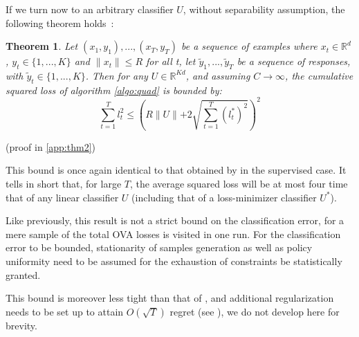 \documentclass[preprint,12pt,authoryear]{elsarticle}
\newtheorem{theorem}{Theorem}
\begin{document}
\vspace{.5cm} 
If we turn now to an arbitrary classifier $U$, without separability assumption, the following theorem holds~:

\begin{theorem}
	\label{theo:BPAT2}
	Let $(x_1,y_1),...,(x_T,y_T)$ be a sequence of examples where $x_t \in \mathbb{R}^d$, $y_t\in \{1,...,K\}$ and $\parallel x_t \parallel\leqslant R$ for all t, let $\tilde{y}_1,...,\tilde{y}_T$ be a sequence of responses, with $\tilde{y}_t\in \{1,...,K\}$. Then for any  $U \in \mathbb{R}^{K d}$, and assuming $C \rightarrow \infty$, the cumulative squared loss of algorithm \ref{algo:quad} is bounded by:
	\[\sum_{t=1}^{T}l_t^2 \leqslant \left(R\parallel{U}\parallel+2 \sqrt{\sum_{t=1}^{T}(l_t^{\ast})^2}\right)^2 \]
\end{theorem}

(proof in \ref{app:thm2})

This bound is once again identical to that obtained by 
\cite{crammer2006online} in the supervised case. 
It tells in short that, for large $T$, the average squared 
loss will be at most four time that of any linear 
classifier $U$ (including that of a loss-minimizer classifier $U^*$). 


Like previously, this result is not a strict bound on the classification error, for a mere sample of the total OVA losses is visited in one run. For the classification error to be bounded, stationarity of samples generation as well as policy uniformity need to be assumed for the exhaustion of constraints be statistically granted.  

This bound is moreover less tight than that of \cite{freund1997decision}, and  additional regularization needs to be set up to attain $O(\sqrt{T})$ regret (see \cite{crammer2006online}),  
we do not develop here for brevity. 



\end{document}

